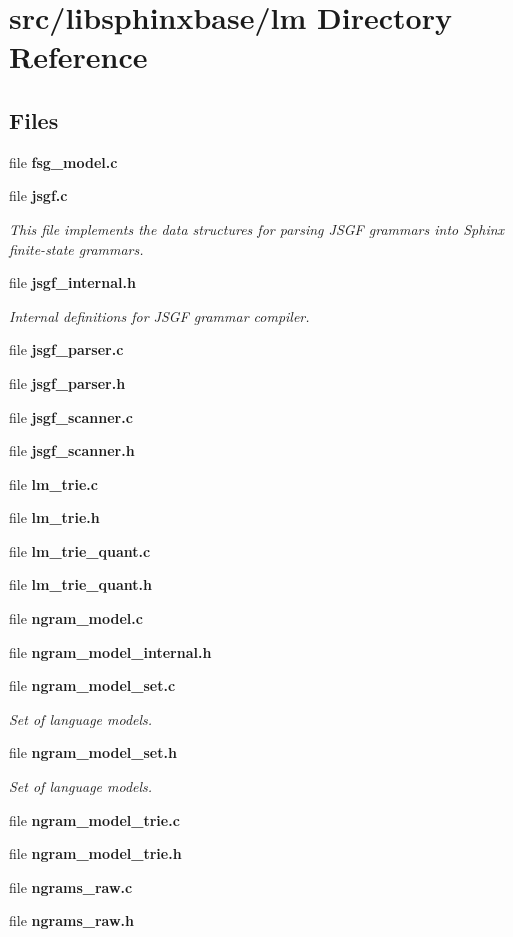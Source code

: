 \section{src/libsphinxbase/lm Directory Reference}
\label{dir_60aae0458aa1ecc8feb93296b73d98ea}
\subsection*{Files}
\begin{DoxyCompactItemize}
\item 
file {\bfseries fsg\+\_\+model.\+c}
\item 
file {\bf jsgf.\+c}
\begin{DoxyCompactList}\small\item\em This file implements the data structures for parsing J\+S\+G\+F grammars into Sphinx finite-\/state grammars. \end{DoxyCompactList}\item 
file {\bf jsgf\+\_\+internal.\+h}
\begin{DoxyCompactList}\small\item\em Internal definitions for J\+S\+G\+F grammar compiler. \end{DoxyCompactList}\item 
file {\bfseries jsgf\+\_\+parser.\+c}
\item 
file {\bfseries jsgf\+\_\+parser.\+h}
\item 
file {\bfseries jsgf\+\_\+scanner.\+c}
\item 
file {\bfseries jsgf\+\_\+scanner.\+h}
\item 
file {\bfseries lm\+\_\+trie.\+c}
\item 
file {\bfseries lm\+\_\+trie.\+h}
\item 
file {\bfseries lm\+\_\+trie\+\_\+quant.\+c}
\item 
file {\bfseries lm\+\_\+trie\+\_\+quant.\+h}
\item 
file {\bfseries ngram\+\_\+model.\+c}
\item 
file {\bfseries ngram\+\_\+model\+\_\+internal.\+h}
\item 
file {\bf ngram\+\_\+model\+\_\+set.\+c}
\begin{DoxyCompactList}\small\item\em Set of language models. \end{DoxyCompactList}\item 
file {\bf ngram\+\_\+model\+\_\+set.\+h}
\begin{DoxyCompactList}\small\item\em Set of language models. \end{DoxyCompactList}\item 
file {\bfseries ngram\+\_\+model\+\_\+trie.\+c}
\item 
file {\bfseries ngram\+\_\+model\+\_\+trie.\+h}
\item 
file {\bfseries ngrams\+\_\+raw.\+c}
\item 
file {\bfseries ngrams\+\_\+raw.\+h}
\end{DoxyCompactItemize}
